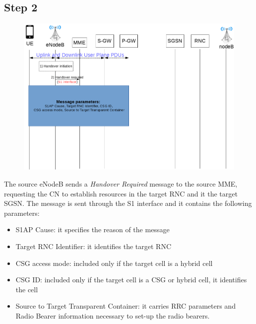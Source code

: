 \subsection*{Step 2}
\begin{figure}[htb]
	\centering
	\includegraphics[width=0.9\linewidth]{img/preparation-2.png}
	\label{fig:2}
\end{figure}
The source eNodeB sends a \emph{Handover Required} message to the
source MME, requesting the CN to establish resources in the target RNC and it the
target SGSN. The message is sent through the S1 interface and it contains the
following parameters:
\begin{itemize}
	\item S1AP Cause: it specifies the reason of the message
	\item Target RNC Identifier: it identifies the target RNC
	\item CSG access mode: included only if the target cell is a hybrid cell
	\item CSG ID: included only if the target cell is a CSG or hybrid cell, it identifies the cell
	\item Source to Target Transparent Container: it carries RRC parameters and
	Radio Bearer information necessary to set-up the radio bearers.
\end{itemize}


